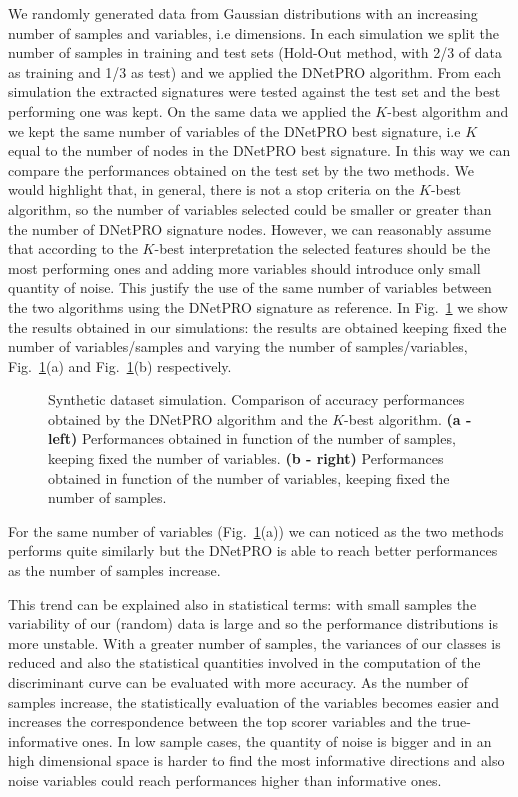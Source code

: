 \documentclass{standalone}
\begin{document}
We randomly generated data from Gaussian distributions with an increasing number of samples and variables, i.e dimensions.
In each simulation we split the number of samples in training and test sets (Hold-Out method, with 2/3 of data as training and 1/3 as test) and we applied the DNetPRO algorithm.
From each simulation the extracted signatures were tested against the test set and the best performing one was kept.
On the same data we applied the $K$-best algorithm and we kept the same number of variables of the DNetPRO best signature, i.e $K$ equal to the number of nodes in the DNetPRO best signature.
In this way we can compare the performances obtained on the test set by the two methods.
We would highlight that, in general, there is not a stop criteria on the $K$-best algorithm, so the number of variables selected could be smaller or greater than the number of DNetPRO signature nodes.
However, we can reasonably assume that according to the $K$-best interpretation the selected features should be the most performing ones and adding more variables should introduce only small quantity of noise.
This justify the use of the same number of variables between the two algorithms using the DNetPRO signature as reference.
In Fig.~\ref{fig:dnetpro_toy} we show the results obtained in our simulations: the results are obtained keeping fixed the number of variables/samples and varying the number of samples/variables, Fig.~\ref{fig:dnetpro_toy}(a) and Fig.~\ref{fig:dnetpro_toy}(b) respectively.

\begin{figure}[htbp]
\centering
\def\svgwidth{0.4\textwidth}

\qquad\qquad
\centering
\def\svgwidth{0.4\textwidth}

\caption{Synthetic dataset simulation.
Comparison of accuracy performances obtained by the DNetPRO algorithm and the $K$-best algorithm.
\textbf{(a - left)} Performances obtained in function of the number of samples, keeping fixed the number of variables.
\textbf{(b - right)} Performances obtained in function of the number of variables, keeping fixed the number of samples.
}
\label{fig:dnetpro_toy}
\end{figure}

For the same number of variables (Fig.~\ref{fig:dnetpro_toy}(a)) we can noticed as the two methods performs quite similarly but the DNetPRO is able to reach better performances as the number of samples increase.

This trend can be explained also in statistical terms: with small samples the variability of our (random) data is large and so the performance distributions is more unstable.
With a greater number of samples, the variances of our classes is reduced and also the statistical quantities involved in the computation of the discriminant curve can be evaluated with more accuracy.
As the number of samples increase, the statistically evaluation of the variables becomes easier and increases the correspondence between the top scorer variables and the true-informative ones.
In low sample cases, the quantity of noise is bigger and in an high dimensional space is harder to find the most informative directions and also noise variables could reach performances higher than informative ones.
\end{document}
